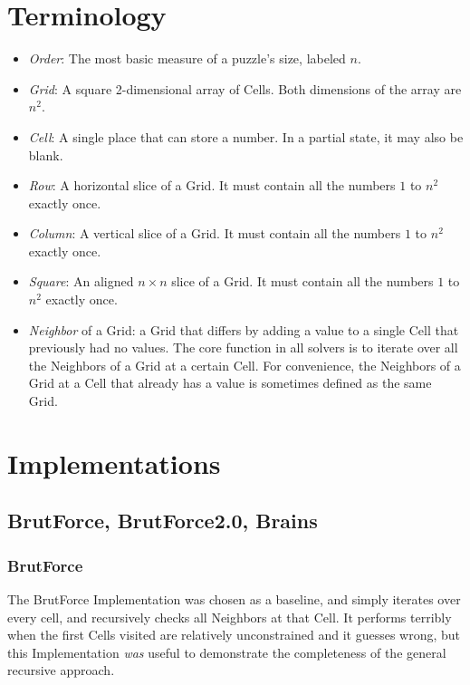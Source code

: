 \documentclass[letterpaper]{article}
\begin{document}
\section{Terminology}

\begin{itemize}
\item \emph{Order}: The most basic measure of a puzzle's size, labeled $n$.
\item \emph{Grid}: A square 2-dimensional array of Cells. Both dimensions of the array are $ n^2 $.
\item \emph{Cell}: A single place that can store a number. In a partial state, it may also be blank.
\item \emph{Row}: A horizontal slice of a Grid. It must contain all the numbers $ 1 $ to $ n^2 $ exactly once.
\item \emph{Column}: A vertical slice of a Grid. It must contain all the numbers $ 1 $ to $ n^2 $ exactly once.
\item \emph{Square}: An aligned $ n \times n $ slice of a Grid. It must contain all the numbers $ 1 $ to $ n^2 $ exactly once.
\item \emph{Neighbor} of a Grid: a Grid that differs by adding a value to a single Cell that previously had no values. The core function in all solvers is to iterate over all the Neighbors of a Grid at a certain Cell. For convenience, the Neighbors of a Grid at a Cell that already has a value is sometimes defined as the same Grid.
\end{itemize}

\section{Implementations}

\subsection{BrutForce, BrutForce2.0, Brains}

\subsubsection{BrutForce}
The BrutForce Implementation was chosen as a baseline, and simply iterates over every cell, and recursively checks all Neighbors at that Cell. It performs terribly when the first Cells visited are relatively unconstrained and it guesses wrong, but this Implementation \emph{was} useful to demonstrate the completeness of the general recursive approach.
\end{document}
